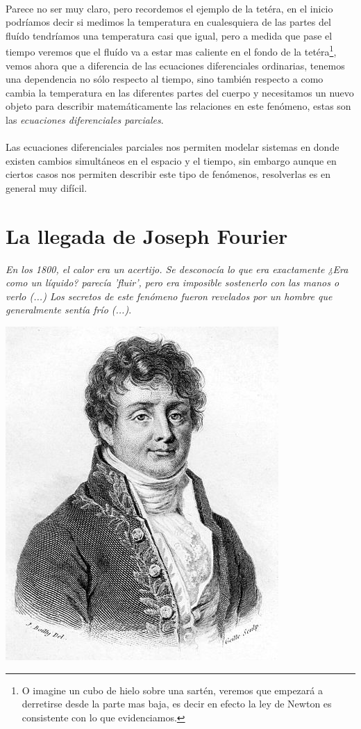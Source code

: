 \documentclass{article}
\begin{document}
\paragraph{}Parece no ser muy claro, pero recordemos el ejemplo de la tetéra, en el inicio podríamos decir si medimos la temperatura en cualesquiera de las partes del fluído tendríamos una temperatura casi que igual, pero a medida que pase el tiempo veremos que el fluído va a estar mas caliente en el fondo de la tetéra\footnote{O imagine un cubo de hielo sobre una sartén, veremos que empezará a derretirse desde la parte mas baja, es decir en efecto la  ley de Newton es consistente con lo que evidenciamos.}, vemos ahora que a diferencia de las ecuaciones diferenciales ordinarias, tenemos una dependencia no sólo respecto al tiempo, sino también respecto a como cambia la temperatura en las diferentes partes del cuerpo y necesitamos un nuevo objeto para describir matemáticamente las relaciones en este fenómeno, estas son las \textit{ecuaciones diferenciales parciales}.
\paragraph{}Las ecuaciones diferenciales parciales nos permiten modelar sistemas en donde existen cambios simultáneos en el espacio y el tiempo\cite{stevenstrogatz2019}, sin embargo aunque en ciertos casos nos permiten describir este tipo de fenómenos, resolverlas es en general muy difícil.
\section{La llegada de Joseph Fourier}
\begin{center}
\textit{En los 1800, el calor era un acertijo. Se desconocía lo que era exactamente ¿Era como un líquido? parecía 'fluir', pero era imposible sostenerlo con las manos o verlo (...) Los secretos de este fenómeno fueron revelados por un hombre que generalmente sentía frío (...)}\cite{stevenstrogatz2019}.
\end{center}
\begin{center}
    \includegraphics[width=0.2\linewidth]{img/393px-Joseph_Fourier.jpg}
\end{center}
\end{document}
